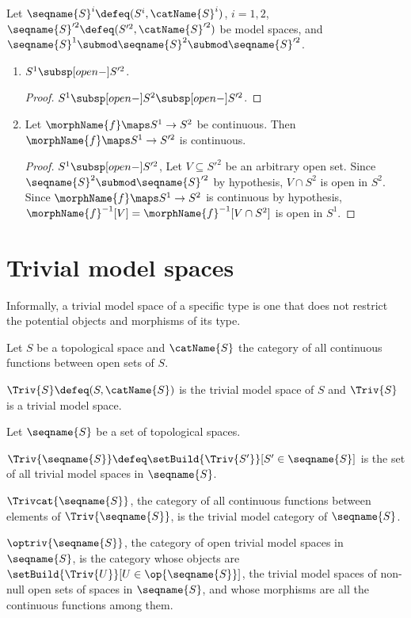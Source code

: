 \documentclass{article}
\begin{document}
\begin{corollary}
\label{cor:modsub}
Let $\seqname{S}^i \defeq (S^i,\catName{S}^i)$, $i=1,2$,
$\seqname{S}'^2 \defeq (S'^2,\catName{S}'^2)$ be model spaces, and
$\seqname{S}^1 \submod \seqname{S}^2 \submod \seqname{S}'^2$.
\begin{enumerate}

\item
$S^1 \subsp[open-] S'^2$.

\begin{proof}
$S^1 \subsp[open-] S^2 \subsp[open-] S'^2$.
\end{proof}

\item
Let $\morphName{f} \maps S^1 \to S^2$ be continuous. Then
$\morphName{f} \maps S^1 \to S'^2$ is continuous.
\begin{proof}
$S^1 \subsp[open-] S'^2$, Let $V \subseteq S'^2$ be an arbitrary open
set.  Since $\seqname{S}^2 \submod \seqname{S}'^2$ by hypothesis,
$V \cap S^2$ is open in $S^2$.  Since $\morphName{f} \maps S^1 \to S^2$
is continuous by hypothesis,
$\morphName{f}^{-1}[V] = \morphName{f}^{-1}[V \cap S^2]$
is open in $S^1$.
\end{proof}
\end{enumerate}
\end{corollary}

\section{Trivial model spaces}
\label{sec:triv}
Informally, a trivial model space of a specific type is one that does
not restrict the potential objects and morphisms of its type.

\begin{definition}
\label{def:trivmod}
Let $S$ be a topological space and $\catName{S}$ the category of all
continuous functions between open sets of $S$.

$\Triv{S} \defeq (S, \catName{S})$ is the trivial model space
of $S$ and $\Triv{S}$ is a trivial model space.

Let $\seqname{S}$ be a set of topological spaces.

$
  \Triv{\seqname{S}}
  \defeq
  \setBuild
    {\Triv{S'}}%
    [S' \in \seqname{S}]
$
is the set of all trivial model spaces in $\seqname{S}$.

$\Trivcat{\seqname{S}}$, the category of all continuous functions
between elements of $\Triv{\seqname{S}}$, is the trivial model category
of $\seqname{S}$.

$\optriv{\seqname{S}}$, the category of open trivial model spaces
in $\seqname{S}$, is the category whose objects are
$\setBuild {\Triv{U}}[U \in \op{\seqname{S}}]$, the trivial
model spaces of non-null open sets of spaces in $\seqname{S}$,
and whose morphisms are all the continuous functions among them.
\end{definition}
\end{document}
